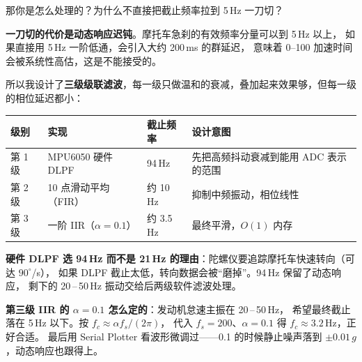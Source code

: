 \documentclass[UTF8,11pt,a4paper]{ctexart}
\begin{document}
\begin{interviewer}
那你是怎么处理的？为什么不直接把截止频率拉到 5\,Hz 一刀切？
\end{interviewer}

\begin{candidate}
\textbf{一刀切的代价是动态响应迟钝}。摩托车急刹的有效频率分量可以到 5\,Hz 以上，
如果直接用 5\,Hz 一阶低通，会引入大约 200\,ms 的群延迟，
意味着 0--100 加速时间会被系统性高估，这是不能接受的。

\medskip
所以我设计了\textbf{三级级联滤波}，每一级只做温和的衰减，叠加起来效果够，但每一级的相位延迟都小：

\begin{center}
\begin{tabularx}{\linewidth}{p{1.5cm}p{3cm}p{2cm}X}
\toprule
级别 & 实现 & 截止频率 & 设计意图 \\
\midrule
第 1 级 & MPU6050 硬件 DLPF & 94\,Hz & 先把高频抖动衰减到能用 ADC 表示的范围 \\
第 2 级 & 10 点滑动平均（FIR）& 约 10\,Hz & 抑制中频振动，相位线性 \\
第 3 级 & 一阶 IIR（$\alpha=0.1$）& 约 3.5\,Hz & 最终平滑，$O(1)$ 内存 \\
\bottomrule
\end{tabularx}
\end{center}

\medskip
\textbf{硬件 DLPF 选 94\,Hz 而不是 21\,Hz 的理由}：陀螺仪要追踪摩托车快速转向（可达 $90^\circ$/s），
如果 DLPF 截止太低，转向数据会被``磨掉''。94\,Hz 保留了动态响应，
剩下的 20\,–\,50\,Hz 振动交给后两级软件滤波处理。

\medskip
\textbf{第三级 IIR 的 $\alpha = 0.1$ 怎么定的}：发动机怠速主振在 20\,–\,50\,Hz，
希望最终截止落在 5\,Hz 以下。按 $f_c \approx \alpha f_s / (2\pi)$，
代入 $f_s = 200$、$\alpha = 0.1$ 得 $f_c \approx 3.2$\,Hz，正好合适。
最后用 Serial Plotter 看波形微调过——0.1 的时候静止噪声落到 $\pm 0.01\,g$，动态响应也跟得上。
\end{candidate}
\end{document}
